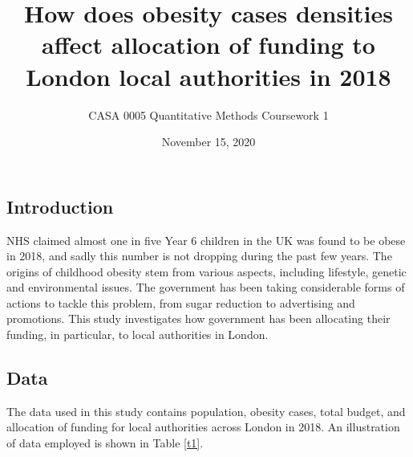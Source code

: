 \documentclass[12pt]{article}
\begin{document}
\title{How does obesity cases densities affect allocation of funding to London local authorities in 2018}
\author{CASA 0005 Quantitative Methods Coursework 1}
\date{November 15, 2020}
\maketitle
\subsection{Introduction}
NHS claimed almost one in five Year 6 children in the UK was found to be obese in 2018, and sadly this number is not dropping during the past few years. The origins of childhood obesity stem from various aspects, including lifestyle, genetic and environmental issues. The government has been taking considerable forms of actions to tackle this problem, from sugar reduction to advertising and promotions. This study investigates how government has been allocating their funding, in particular, to local authorities in London.


\subsection{Data}
The data used in this study contains population, obesity cases, total budget, and allocation of funding for local authorities across London in 2018. An illustration of data employed is shown in Table \eqref{t1}. 
\begin{table}[H]

\begin{center}
\captionsetup{font=scriptsize}
\caption{Illustration of data used, list of column names{} include: \newline
Names of local authority areas; total obesity cases in each area; total population; obesity density per 100 people (obesity cases divided by population multiplied by 100); total budget allocated (in pounds); percent of budget spent on improving air quality, cleaner environment, health training, raising school awareness, media awareness and subsiding counselling.
} \label{t1}
\end{center}
\end{table}
\end{document}
